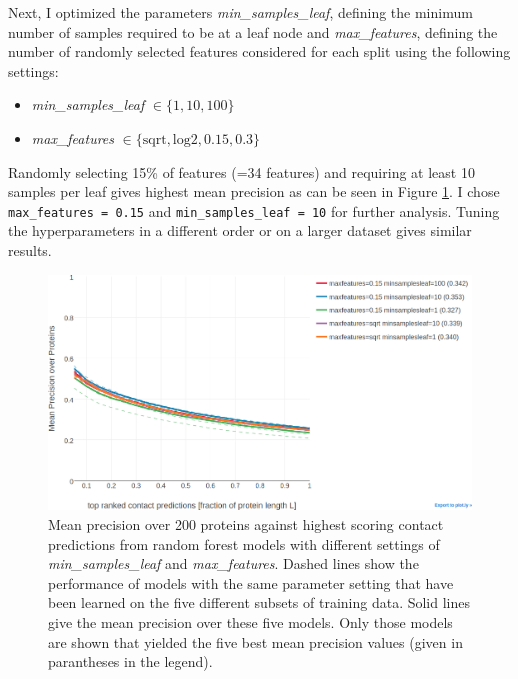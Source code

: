 \documentclass[12pt,a4paper,twoside]{book}
\providecommand{\tightlist}{%
  \setlength{\itemsep}{0pt}\setlength{\parskip}{0pt}}
\theoremstyle{definition}
\theoremstyle{definition}
\theoremstyle{remark}
\begin{document}
Next, I optimized the parameters \emph{min\_samples\_leaf}, defining the
minimum number of samples required to be at a leaf node and
\emph{max\_features}, defining the number of randomly selected features
considered for each split using the following settings:

\begin{itemize}
\tightlist
\item
  \emph{min\_samples\_leaf} \(\in \{1, 10, 100\}\)
\item
  \emph{max\_features} \(\in \{\text{sqrt}, \text{log2}, 0.15, 0.3\}\)
\end{itemize}

Randomly selecting 15\% of features (=34 features) and requiring at
least 10 samples per leaf gives highest mean precision as can be seen in
Figure \ref{fig:rf-gridsearch-maxdepth-minsampleleaf}. I chose
\texttt{max\_features\ =\ 0.15} and \texttt{min\_samples\_leaf\ =\ 10}
for further analysis. Tuning the hyperparameters in a different order or
on a larger dataset gives similar results.










\begin{figure}

{\centering \includegraphics[width=0.9\linewidth]{img/random_forest_contact_prior/new_gridsearch/precision_vs_rank_cv_on_test_random_forest_nestimators1000_maxdepth100_for_maxfeatures_minsampleleaf_top5_notitle} 

}

\caption{Mean precision over 200
proteins against highest scoring contact predictions from random forest
models with different settings of \emph{min\_samples\_leaf} and
\emph{max\_features}. Dashed lines show the performance of models with
the same parameter setting that have been learned on the five different
subsets of training data. Solid lines give the mean precision over these
five models. Only those models are shown that yielded the five best mean
precision values (given in parantheses in the legend).}\label{fig:rf-gridsearch-maxdepth-minsampleleaf}
\end{figure}
\end{document}
